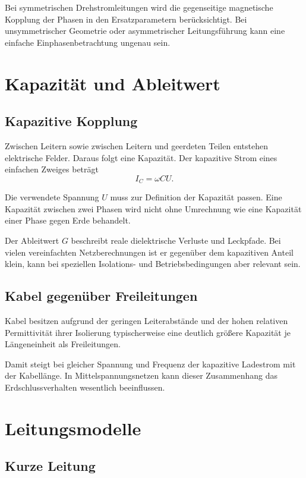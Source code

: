 Bei symmetrischen Drehstromleitungen wird die gegenseitige magnetische Kopplung
der Phasen in den Ersatzparametern berücksichtigt. Bei unsymmetrischer Geometrie
oder asymmetrischer Leitungsführung kann eine einfache Einphasenbetrachtung
ungenau sein.

\section{Kapazität und Ableitwert}

\subsection{Kapazitive Kopplung}

Zwischen Leitern sowie zwischen Leitern und geerdeten Teilen entstehen
elektrische Felder. Daraus folgt eine Kapazität. Der kapazitive Strom eines
einfachen Zweiges beträgt
\[
  I_C=\omega C U.
\]

Die verwendete Spannung \(U\) muss zur Definition der Kapazität passen.
Eine Kapazität zwischen zwei Phasen wird nicht ohne Umrechnung wie eine
Kapazität einer Phase gegen Erde behandelt.

Der Ableitwert \(G\) beschreibt reale dielektrische Verluste und Leckpfade.
Bei vielen vereinfachten Netzberechnungen ist er gegenüber dem kapazitiven
Anteil klein, kann bei speziellen Isolations- und Betriebsbedingungen aber
relevant sein.

\subsection{Kabel gegenüber Freileitungen}

Kabel besitzen aufgrund der geringen Leiterabstände und der hohen relativen
Permittivität ihrer Isolierung typischerweise eine deutlich größere Kapazität
je Längeneinheit als Freileitungen.

Damit steigt bei gleicher Spannung und Frequenz der kapazitive Ladestrom
mit der Kabellänge. In Mittelspannungsnetzen kann dieser Zusammenhang das
Erdschlussverhalten wesentlich beeinflussen.

\section{Leitungsmodelle}

\subsection{Kurze Leitung}

